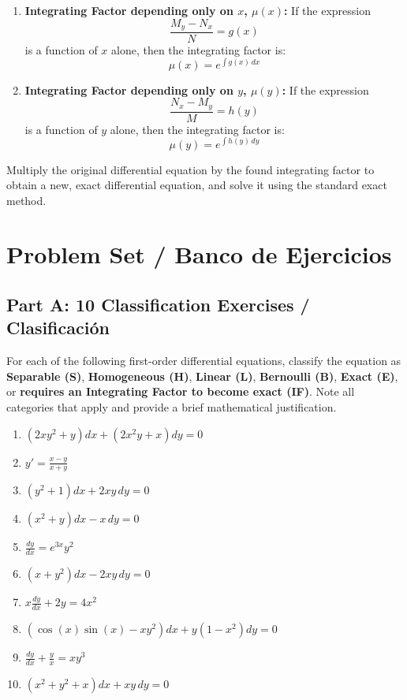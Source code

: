 \documentclass[11pt,letterpaper]{article}
\begin{document}
\begin{enumerate}
    \item \textbf{Integrating Factor depending only on $x$, $\mu(x)$:}
    If the expression
    \begin{equation}
        \frac{M_y - N_x}{N} = g(x)
    \end{equation}
    is a function of $x$ alone, then the integrating factor is:
    \begin{equation}
        \mu(x) = e^{\int g(x) \, dx}
    \end{equation}

    \item \textbf{Integrating Factor depending only on $y$, $\mu(y)$:}
    If the expression
    \begin{equation}
        \frac{N_x - M_y}{M} = h(y)
    \end{equation}
    is a function of $y$ alone, then the integrating factor is:
    \begin{equation}
        \mu(y) = e^{\int h(y) \, dy}
    \end{equation}
\end{enumerate}

Multiply the original differential equation by the found integrating factor to obtain a new, exact differential equation, and solve it using the standard exact method.

\newpage
\section{Problem Set / Banco de Ejercicios}

\subsection*{Part A: 10 Classification Exercises / Clasificación}
For each of the following first-order differential equations, classify the equation as \textbf{Separable (S)}, \textbf{Homogeneous (H)}, \textbf{Linear (L)}, \textbf{Bernoulli (B)}, \textbf{Exact (E)}, or \textbf{requires an Integrating Factor to become exact (IF)}. Note all categories that apply and provide a brief mathematical justification.

\begin{enumerate}[label=\textbf{\arabic*.}]
    \item $(2xy^2 + y)dx + (2x^2y + x)dy = 0$
    \item $y' = \frac{x-y}{x+y}$
    \item $(y^2 + 1)dx + 2xy\,dy = 0$
    \item $(x^2 + y)dx - x\,dy = 0$
    \item $\frac{dy}{dx} = e^{3x} y^2$
    \item $(x + y^2)dx - 2xy\,dy = 0$
    \item $x \frac{dy}{dx} + 2y = 4x^2$
    \item $(\cos(x)\sin(x) - xy^2)dx + y(1-x^2)dy = 0$
    \item $\frac{dy}{dx} + \frac{y}{x} = x y^3$
    \item $(x^2 + y^2 + x)dx + xy\,dy = 0$
\end{enumerate}
\end{document}
